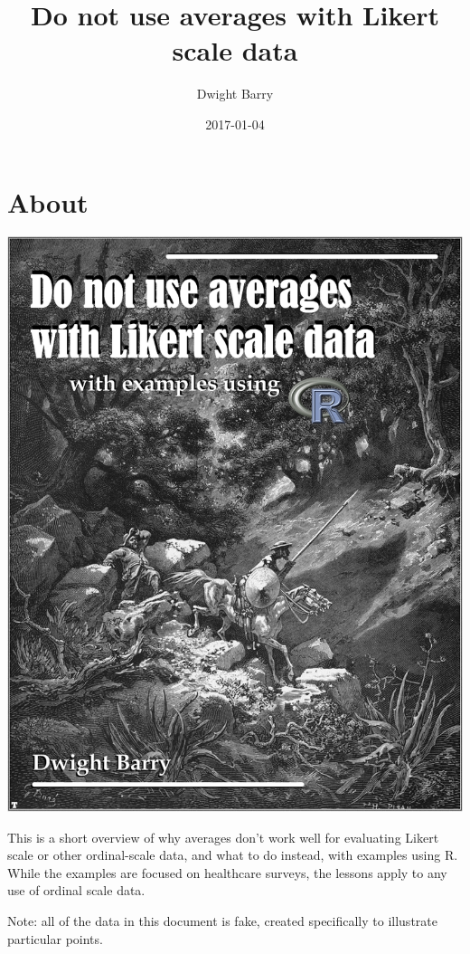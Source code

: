 \documentclass[]{book}
\title{Do not use averages with Likert scale data}
\author{Dwight Barry}
\date{2017-01-04}
\begin{document}
\maketitle

{
\setcounter{tocdepth}{1}
\tableofcontents
}
\chapter*{About}\label{about}

\begin{center}\includegraphics[width=11.35in]{images/likert_cover} \end{center}

This is a short overview of why averages don't work well for evaluating
Likert scale or other ordinal-scale data, and what to do instead, with
examples using R. While the examples are focused on healthcare surveys,
the lessons apply to any use of ordinal scale data.

Note: all of the data in this document is fake, created specifically to
illustrate particular points.
\end{document}
